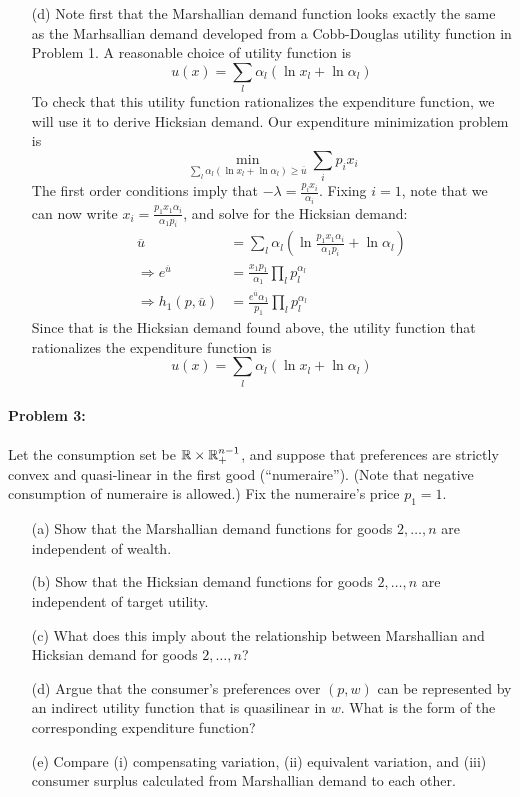 \documentclass[12pt]{article}
\begin{document}
\begin{itemize}
    \item[(d)] Note first that the Marshallian demand function looks exactly the same as the Marhsallian demand developed from a Cobb-Douglas utility function in Problem 1. A reasonable choice of utility function is
    \[
    u(x) = \sum_l \alpha_l (\ln x_l + \ln \alpha_l)
    \]
    To check that this utility function rationalizes the expenditure function, we will use it to derive Hicksian demand. Our expenditure minimization problem is
    \[
    \min_{\sum_l \alpha_l (\ln x_l + \ln \alpha_l) \ge \overline{u}} \sum_i p_ix_i
    \]
    The first order conditions imply that $-\lambda = \frac{p_ix_i}{\alpha_i}$. Fixing $i = 1$, note that we can now write $x_i = \frac{p_1x_1\alpha_i}{\alpha_1 p_i}$, and solve for the Hicksian demand:
    \begin{align*}
        \overline{u} &= \sum_l \alpha_l (\ln \frac{p_1x_1\alpha_i}{\alpha_1 p_i} + \ln \alpha_l) \\
        \Longrightarrow e^{\overline{u}} &= \frac{x_1p_1}{\alpha_1} \prod_l p_l^{\alpha_l} \\
        \Longrightarrow h_1(p,\overline{u}) &= \frac{e^{\overline{u}}\alpha_1}{p_1}\prod_l p_l^{\alpha_l}
    \end{align*}
    Since that is the Hicksian demand found above, the utility function that rationalizes the expenditure function is
    \[
    u(x) = \sum_l \alpha_l (\ln x_l + \ln \alpha_l)
    \]
\end{itemize}

\paragraph{Problem 3:} Let the consumption set be $\mathbb{R} \times \mathbb{R}_+^{n-1}$, and suppose that preferences are strictly convex and quasi-linear in the first good (``numeraire''). (Note that negative consumption of numeraire is allowed.) Fix the numeraire's price $p_1 = 1$.

\begin{itemize}
    \item[(a)] Show that the Marshallian demand functions for goods $2,\dots,n$ are independent of wealth. 

    \item[(b)] Show that the Hicksian demand functions for goods $2,\dots,n$ are independent of target utility.

    \item[(c)] What does this imply about the relationship between Marshallian and Hicksian demand for goods $2,\dots,n$?

    \item[(d)] Argue that the consumer's preferences over $(p,w)$ can be represented by an indirect utility function that is quasilinear in $w$. What is the form of the corresponding expenditure function?

    \item[(e)] Compare (i) compensating variation, (ii) equivalent variation, and (iii) consumer surplus calculated from Marshallian demand to each other.
\end{itemize}
\end{document}

